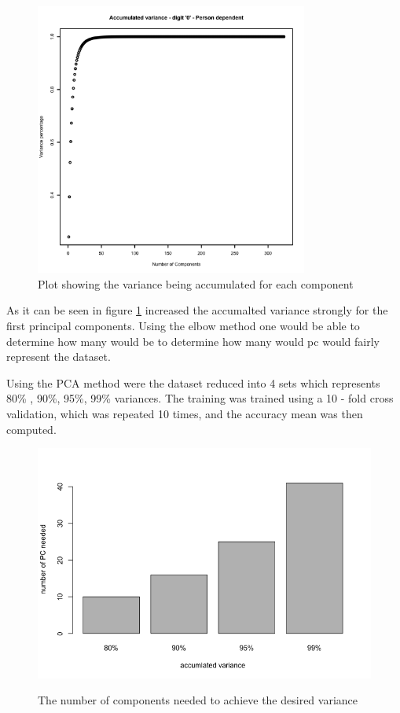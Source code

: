 \begin{figure}[H]
\centering
\includegraphics[width = 0.8\textwidth]{graphics/accumulated-2-1-person-dependent.png}
\caption{Plot showing the variance being accumulated for each component}
\label{fig:PCa_num_comp}
\end{figure}

As it can be seen in figure \ref{fig:PCa_num_comp} increased the accumalted
variance strongly for the first principal components. 
 Using the elbow method one would be able to determine how 
 many would be to determine how many would pc would fairly represent the dataset. 


Using the PCA method were the dataset reduced into 4 sets 
 which represents 80\% , 90\%, 95\%, 99\% variances. 
 The training was trained using a 10 - fold cross validation, 
 which was repeated 10 times, and the accuracy mean was then computed. 

\begin{figure}[H]
\centering
\includegraphics[width = \textwidth]{graphics/PCA_barplot.png}
\label{fig:pca_comp}
\caption{The number of components needed to achieve the desired variance}
\end{figure}

